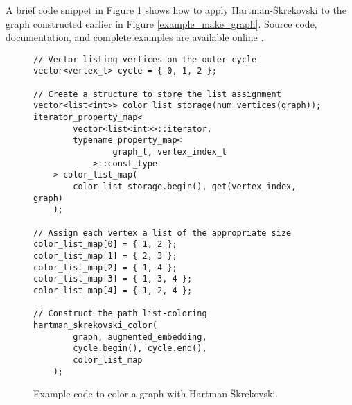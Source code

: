 \documentclass[letterpaper, 12pt]{article}
\theoremstyle{thm}
\begin{document}
A brief code snippet in Figure \ref{example_hartman} shows how to apply
Hartman-\v{S}krekovski to the graph constructed earlier in Figure \ref{example_make_graph}.
Source code, documentation, and complete examples are available online \cite{code}.

\begin{figure}
\begin{lstlisting}[frame=single]
// Vector listing vertices on the outer cycle
vector<vertex_t> cycle = { 0, 1, 2 };

// Create a structure to store the list assignment
vector<list<int>> color_list_storage(num_vertices(graph));
iterator_property_map<
        vector<list<int>>::iterator,
        typename property_map<
                graph_t, vertex_index_t
            >::const_type
    > color_list_map(
        color_list_storage.begin(), get(vertex_index, graph)
    );

// Assign each vertex a list of the appropriate size
color_list_map[0] = { 1, 2 };
color_list_map[1] = { 2, 3 };
color_list_map[2] = { 1, 4 };
color_list_map[3] = { 1, 3, 4 };
color_list_map[4] = { 1, 2, 4 };

// Construct the path list-coloring
hartman_skrekovski_color(
        graph, augmented_embedding,
        cycle.begin(), cycle.end(),
        color_list_map
    );
\end{lstlisting}
\caption{Example code to color a graph with Hartman-\v{S}krekovski.}
\label{example_hartman}
\end{figure}
\end{document}
